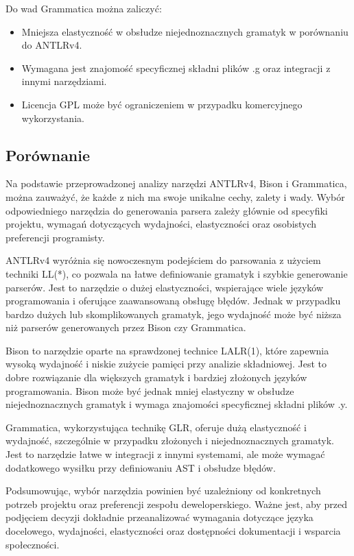 \documentclass[12pt,twoside]{article}
\begin{document}
Do wad Grammatica można zaliczyć:
\begin{itemize}[label=\textbullet, leftmargin=1.25cm]
   \item Mniejsza elastyczność w obsłudze niejednoznacznych gramatyk w porównaniu do ANTLRv4.
   \item Wymagana jest znajomość specyficznej składni plików .g oraz integracji z innymi narzędziami.
   \item Licencja GPL może być ograniczeniem w przypadku komercyjnego wykorzystania.
\end{itemize}

\subsection{Porównanie}
Na podstawie przeprowadzonej analizy narzędzi ANTLRv4, Bison i Grammatica, można zauważyć, że każde z nich ma swoje unikalne cechy, zalety i wady. Wybór odpowiedniego narzędzia do generowania parsera zależy głównie od specyfiki projektu, wymagań dotyczących wydajności, elastyczności oraz osobistych preferencji programisty.

ANTLRv4 wyróżnia się nowoczesnym podejściem do parsowania z użyciem techniki LL(*), co pozwala na łatwe definiowanie gramatyk i szybkie generowanie parserów. Jest to narzędzie o dużej elastyczności, wspierające wiele języków programowania i oferujące zaawansowaną obsługę błędów. Jednak w przypadku bardzo dużych lub skomplikowanych gramatyk, jego wydajność może być niższa niż parserów generowanych przez Bison czy Grammatica.

Bison to narzędzie oparte na sprawdzonej technice LALR(1), które zapewnia wysoką wydajność i niskie zużycie pamięci przy analizie składniowej. Jest to dobre rozwiązanie dla większych gramatyk i bardziej złożonych języków programowania. Bison może być jednak mniej elastyczny w obsłudze niejednoznacznych gramatyk i wymaga znajomości specyficznej składni plików .y.

Grammatica, wykorzystująca technikę GLR, oferuje dużą elastyczność i wydajność, szczególnie w przypadku złożonych i niejednoznacznych gramatyk. Jest to narzędzie łatwe w integracji z innymi systemami, ale może wymagać dodatkowego wysiłku przy definiowaniu AST i obsłudze błędów.

Podsumowując, wybór narzędzia powinien być uzależniony od konkretnych potrzeb projektu oraz preferencji zespołu deweloperskiego. Ważne jest, aby przed podjęciem decyzji dokładnie przeanalizować wymagania dotyczące języka docelowego, wydajności, elastyczności oraz dostępności dokumentacji i wsparcia społeczności.
\clearpage
\end{document}
